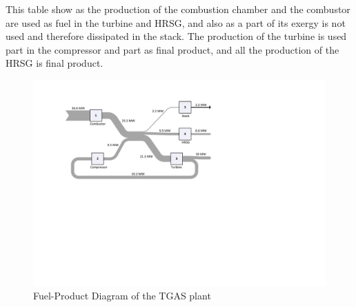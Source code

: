 \documentclass{ecos2018}
\begin{document}
This table show as the production of the combustion chamber and the combustor are used as fuel in the turbine and HRSG, and also as a part of its exergy is not used and therefore dissipated in the stack. The production of the turbine is used part in the compressor and part as final product, and all the production of the HRSG is final product.

\begin{figure}[H]
\includegraphics[width=0.85\linewidth]{tgasfp_exergy}
\caption{Fuel-Product Diagram of the TGAS plant}
\label{fig1}
\end{figure}
\end{document}
